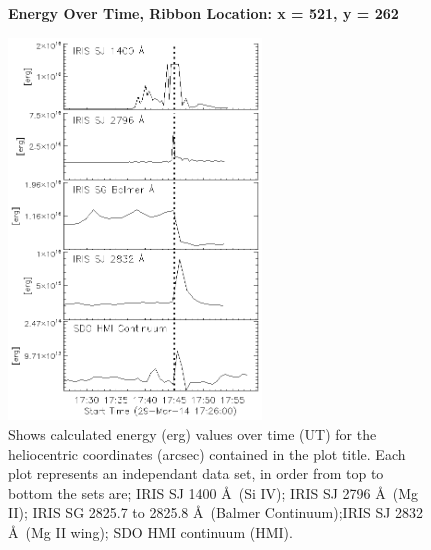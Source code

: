 \begin{figure}[H]
  \begin{center}
  \textbf{Energy Over Time, Ribbon Location: x = 521, y = 262 }\par\medskip
  \includegraphics[width=0.6\textwidth]{29-Mar-14-Ribbon-xyPosition-521-262-Frame-1-Energy-Ladder}
  \end{center}
  \caption{Shows calculated energy (erg) values over time (UT) for the heliocentric coordinates (arcsec) contained in the plot title. Each plot represents an independant data set, in order from top to bottom the sets are; IRIS SJ 1400 \AA\ (Si IV); IRIS SJ 2796 \AA\ (Mg II); IRIS SG  2825.7 to 2825.8 \AA\ (Balmer Continuum);IRIS SJ 2832 \AA\ (Mg II wing); SDO HMI continuum (HMI).}\label{erb5}
\end{figure}

